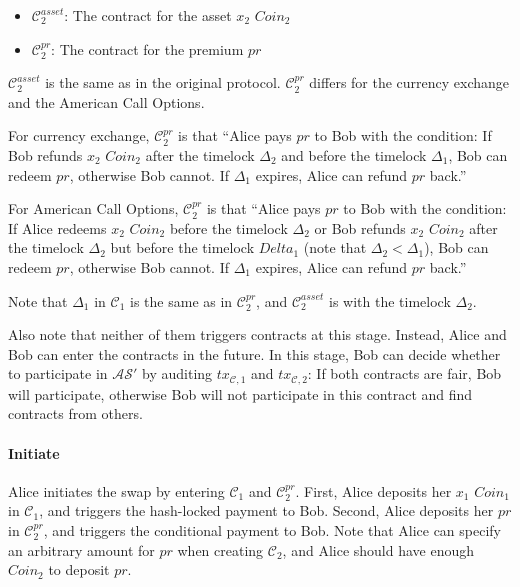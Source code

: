 \begin{itemize}
    \item $\mathcal{C}^{asset}_2$: The contract for the asset $x_2$ $Coin_2$
    \item $\mathcal{C}^{pr}_2$: The contract for the premium $pr$
\end{itemize}

$\mathcal{C}^{asset}_2$ is the same as in the original protocol.
$\mathcal{C}^{pr}_2$ differs for the currency exchange and the American Call Options.

For currency exchange, $\mathcal{C}^{pr}_2$ is that
``Alice pays $pr$ to Bob with the condition: If Bob refunds $x_2$ $Coin_2$ after the timelock $\Delta_2$ and before the timelock $\Delta_1$, Bob can redeem $pr$, otherwise Bob cannot.
If $\Delta_1$ expires, Alice can refund $pr$ back.''

For American Call Options, $\mathcal{C}^{pr}_2$ is that
``Alice pays $pr$ to Bob with the condition: If Alice redeems $x_2$ $Coin_2$ before the timelock $\Delta_2$ or Bob refunds $x_2$ $Coin_2$ after the timelock $\Delta_2$ but before the timelock $Delta_1$ (note that $\Delta_2 < \Delta_1$), Bob can redeem $pr$, otherwise Bob cannot.
If $\Delta_1$ expires, Alice can refund $pr$ back.''


Note that $\Delta_1$ in $\mathcal{C}_1$ is the same as in $\mathcal{C}^{pr}_2$, and $\mathcal{C}^{asset}_2$ is with the timelock $\Delta_2$.

Also note that neither of them triggers contracts at this stage.
Instead, Alice and Bob can enter the contracts in the future.
In this stage, Bob can decide whether to participate in $\mathcal{AS}'$ by auditing $tx_{\mathcal{C}, 1}$ and $tx_{\mathcal{C}, 2}$: If both contracts are fair, Bob will participate, otherwise Bob will not participate in this contract and find contracts from others.

\paragraph{Initiate}
Alice initiates the swap by entering $\mathcal{C}_1$ and $\mathcal{C}^{pr}_2$.
First, Alice deposits her $x_1$ $Coin_1$ in $\mathcal{C}_1$, and triggers the hash-locked payment to Bob.
Second, Alice deposits her $pr$ in $\mathcal{C}^{pr}_2$, and triggers the conditional payment to Bob.
Note that Alice can specify an arbitrary amount for $pr$ when creating $\mathcal{C}_2$, and Alice should have enough $Coin_2$ to deposit $pr$.

